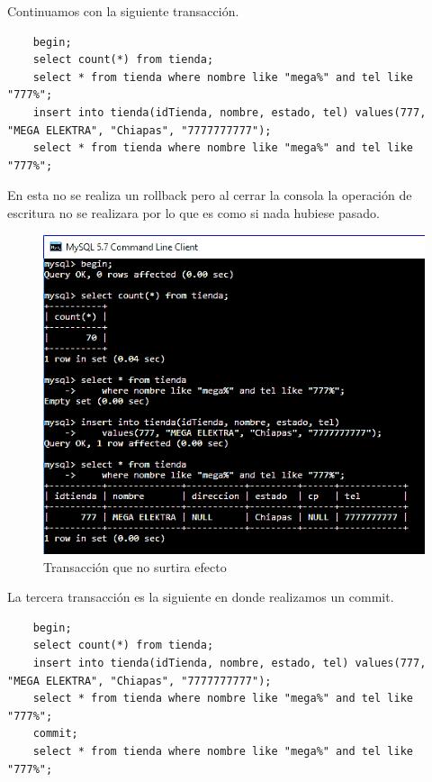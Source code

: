 \documentclass[12pt, titlepage]{article}
\begin{document}
	Continuamos con la siguiente transacción.
	\begin{lstlisting}
	begin;
	select count(*) from tienda;
	select * from tienda where nombre like "mega%" and tel like "777%";
	insert into tienda(idTienda, nombre, estado, tel) values(777, "MEGA ELEKTRA", "Chiapas", "7777777777");
	select * from tienda where nombre like "mega%" and tel like "777%";
	\end{lstlisting}
	
	En esta no se realiza un rollback pero al cerrar la consola la operación de escritura no se realizara por lo que es como si nada hubiese pasado.
	
	\begin{figure}[H]
		\begin{center}
			\includegraphics[width=\textwidth]{img/dos.png}
			\caption{Transacción que no surtira efecto}
			\label{fig:dos}
		\end{center}
	\end{figure}
	
	La tercera transacción es la siguiente en donde realizamos un commit.
	
	\begin{lstlisting}
	begin;
	select count(*) from tienda;
	insert into tienda(idTienda, nombre, estado, tel) values(777, "MEGA ELEKTRA", "Chiapas", "7777777777");
	select * from tienda where nombre like "mega%" and tel like "777%";
	commit;
	select * from tienda where nombre like "mega%" and tel like "777%";
	\end{lstlisting}
	
\end{document}
